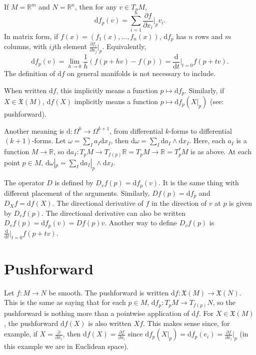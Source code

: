 \documentclass[10pt]{article}
\newcommand{\gap}{\vspace{3mm}}
\newcommand{\bb}[1]{\mathbb{#1}}
\newcommand{\de}{\mathrm{d}}
\newcommand{\frakx}{\mathfrak{X}}
\newcommand{\partials}[2]{\frac{\partial #1}{\partial #2}}
\begin{document}
	\gap
	If $M = \bb{R}^m$ and $N = \bb{R}^n$, then for any $v \in T_p M$,
	\[ \de f_p(v) = \sum_{i=1}^{n} \partials{f}{x_i} \bigg|_p v_i. \]
	In matrix form, if $f(x) = (f_1(x), \ldots, f_n(x))$, $\de f_p$ has $n$ rows and $m$ columns, with $ij$th element $\partials{f_i}{x_j} \big|_p$. Equivalently,
	\[ \de f_p(v) = \lim_{h \to 0} \frac{1}{h} (f(p + hv) - f(p)) = \frac{\de}{\de t} \big|_{t=0} f(p + tv). \]
	The definition of $\de f$ on general manifolds is not necessary to include.

	\gap
	When written $\de f$, this implicitly means a function $p \mapsto \de f_p$. Similarly, if $X \in \frakx(M)$, $\de f(X)$ implicitly means a function $p \mapsto \de f_p(X|_p)$ (see: pushforward).

	\gap
	Another meaning is $\de : \Omega^k \to \Omega^{k+1}$, from differential $k$-forms to differential $(k+1)$-forms. Let $\omega = \sum_I a_I \de x_I$, then $\de \omega = \sum_I \de a_I \wedge \de x_I$. Here, each $a_I$ is a function $M \to \bb{R}$, so $\de a_I : T_p M \to T_{f(p)} \bb{R} = T_p M \to \bb{R} = T_p^* M$ is as above. At each point $p \in M$, $\de \omega|_p = \sum_I \de a_I|_p \wedge \de x_I$.

	\gap
	The operator $D$ is defined by $D_v f(p) = \de f_p(v)$. It is the same thing with different placement of the arguments. Similarly, $Df(p) = \de f_p$ and $D_X f = \de f(X)$. The directional derivative of $f$ in the direction of $v$ at $p$ is given by $D_v f(p)$. The directional derivative can also be written $D_v f(p) = \de f_p(v) = Df(p)v$. Another way to define $D_v f(p)$ is $\frac{\de}{\de t} \big|_{t=0} f(p + tv)$.

	\section*{Pushforward}
	Let $f : M \to N$ be smooth. The pushforward is written $\de f : \frakx(M) \to \frakx(N)$. This is the same as saying that for each $p \in M$, $\de f_p : T_p M \to T_{f(p)} N$, so the pushforward is nothing more than a pointwise application of $\de f$. For $X \in \frakx(M)$, the pushforward $\de f(X)$ is also written $Xf$. This makes sense since, for example, if $X = \partials{}{x_i}$, then $\de f(X) = \partials{f}{x_i}$ since $\de f_p(X|_p) = \de f_p(e_i) = \partials{f}{x_i} \big|_p$ (in this example we are in Euclidean space).
\end{document}
